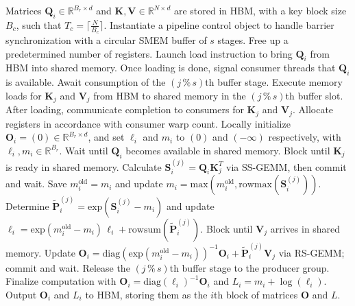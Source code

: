 \begin{algorithm}[H]
    \caption{\small\label{alg:flash3_wgmma_ws_only}\textsc{FlashAttention-3} forward pass \textbf{without} intra-consumer overlapping -- CTA view}
    \begin{algorithmic}[1]
\REQUIRE Matrices $\mathbf{Q}_i \in \mathbb{R}^{B_r \times d}$ and $\mathbf{K}, \mathbf{V} \in \mathbb{R}^{N \times d}$ are stored in HBM, with a key block size $B_c$, such that $T_c = \lceil \frac{N}{B_c} \rceil$.
\STATE Instantiate a pipeline control object to handle barrier synchronization with a circular SMEM buffer of $s$ stages.
\STATE Free up a predetermined number of registers.
\STATE Launch load instruction to bring $\mathbf{Q}_i$ from HBM into shared memory.
\STATE Once loading is done, signal consumer threads that $\mathbf{Q}_i$ is available.
    \STATE Await consumption of the $(j\,\%\,s)$th buffer stage.
    \STATE Execute memory loads for $\mathbf{K}_j$ and $\mathbf{V}_j$ from HBM to shared memory in the $(j\,\%\,s)$th buffer slot.
    \STATE After loading, communicate completion to consumers for $\mathbf{K}_j$ and $\mathbf{V}_j$.
\ENDFOR
\ELSE \STATE Allocate registers in accordance with consumer warp count.
\STATE Locally initialize $\mathbf{O}_i = (0) \in \mathbb{R}^{B_r \times d}$, and set $\ell_i$ and $m_i$ to $(0)$ and $(-\infty)$ respectively, with $\ell_i, m_i \in \mathbb{R}^{B_r}$.
\STATE Wait until $\mathbf{Q}_i$ becomes available in shared memory.
\STATE Block until $\mathbf{K}_j$ is ready in shared memory.
\STATE Calculate $\mathbf{S}_i^{(j)} = \mathbf{Q}_i \mathbf{K}_j^T$ via SS-GEMM, then commit and wait. \label{alg:ws_only_gemm1}
\STATE Save $m_i^{\mathrm{old}} = m_i$ and update $m_i = \mathrm{max}(m_i^{\mathrm{old}}, \mathrm{rowmax}(\mathbf{S}_i^{(j)}))$. \label{code-ws:softmax_start}
\STATE Determine $\widetilde{\mathbf{P}}_i^{(j)} = \mathrm{exp}(\mathbf{S}_i^{(j)} - m_i)$ and update $\ell_i = \mathrm{exp}(m_i^{\mathrm{old}} - m_i)\,\ell_i + \mathrm{rowsum}(\widetilde{\mathbf{P}}_i^{(j)})$. \label{code-ws:softmax_end}
\STATE Block until $\mathbf{V}_j$ arrives in shared memory.
\STATE Update $\mathbf{O}_i = \mathrm{diag}(\mathrm{exp}(m_i^{\mathrm{old}} - m_i))^{-1}\mathbf{O}_i + \widetilde{\mathbf{P}}_i^{(j)}\mathbf{V}_j$ via RS-GEMM; commit and wait. \label{alg:ws_only_gemm2}
\STATE Release the $(j\,\%\,s)$th buffer stage to the producer group.
\ENDFOR
\STATE Finalize computation with $\mathbf{O}_i = \mathrm{diag}(\ell_i)^{-1}\mathbf{O}_i$ and $L_i = m_i + \log(\ell_i)$.
\STATE Output $\mathbf{O}_i$ and $L_i$ to HBM, storing them as the $i$th block of matrices $\mathbf{O}$ and $L$.
\ENDIF
\end{algorithmic}
\end{algorithm}

